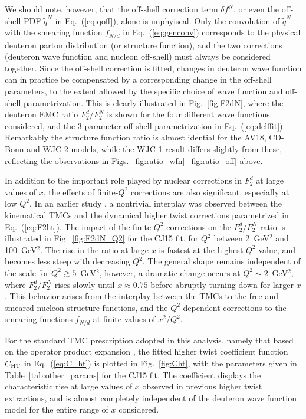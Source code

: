 \documentclass[aps,prd,amsmath,preprint]{revtex4}
\begin{document}
We should note, however, that the off-shell correction term
$\delta f^N$, or even the off-shell PDF $\widetilde{q}^N$ in
Eq.~(\ref{eq:qoff}), alone is unphyiscal.  Only the convolution
of $\widetilde{q}^N$ with the smearing function $f_{N/d}$ in
Eq.~(\ref{eq:genconv}) corresponds to the physical deuteron
parton distribution (or structure function), and the two
corrections (deuteron wave function and nucleon off-shell)
must always be considered together.
Since the off-shell correction is fitted, changes in deuteron
wave function can in practice be compensated by a corresponding
change in the off-shell parameters, to the extent allowed by the
specific choice of wave function and off-shell parametrization.
This is clearly illustrated in Fig.~\ref{fig:F2dN}, where the
deuteron EMC ratio $F_2^d/F_2^N$ is shown for the four different
wave functions considered, and the 3-parameter off-shell
parametrization in Eq.~(\ref{eq:delffit}).
Remarkably the structure function ratio is almost idential for
the AV18, CD-Bonn and WJC-2 models, while the WJC-1 result
differs slightly from these, reflecting the observations in
Figs.~\ref{fig:ratio_wfn}--\ref{fig:ratio_off} above.


In addition to the important role played by nuclear corrections
in $F_2^d$ at large values of $x$, the effects of finite-$Q^2$
corrections are also significant, especially at low $Q^2$.
In an earlier study \cite{CJ10}, a nontrivial interplay was
observed between the kinematical TMCs and the dynamical higher
twist corrections parametrized in Eq.~(\ref{eq:F2ht}).
The impact of the finite-$Q^2$ corrections on the $F_2^d/F_2^N$
ratio is illustrated in Fig.~\ref{fig:F2dN_Q2} for the CJ15
fit, for $Q^2$ between 2~GeV$^2$ and 100~GeV$^2$.
The rise in the ratio at large $x$ is fastest at the highest
$Q^2$ value, and becomes less steep with decreasing $Q^2$.
The general shape remains independent of the scale for
$Q^2 \gtrsim 5$~GeV$^2$, however, a dramatic change occurs at
$Q^2 \sim 2$~GeV$^2$, where $F_2^d/F_2^N$ rises slowly until
$x \approx 0.75$ before abruptly turning down for larger $x$.
This behavior arises from the interplay between the TMCs to
the free and smeared nucleon structure functions, and the
$Q^2$ dependent corrections to the smearing functions $f_{N/d}$
at finite values of $x^2/Q^2$.


For the standard TMC prescription adopted in this analysis,
namely that based on the operator product expansion \cite{GP76},
the fitted higher twist coefficient function $C_{\rm HT}$
in Eq.~(\ref{eq:C_ht}) is plotted in Fig.~\ref{fig:Cht},
with the parameters given in Table~\ref{tab:other_params}
for the CJ15 fit.
The coefficient displays the characteristic rise at large values
of $x$ observed in previous higher twist extractions, and is
almost completely independent of the deuteron wave function
model for the entire range of $x$ considered.
\end{document}
